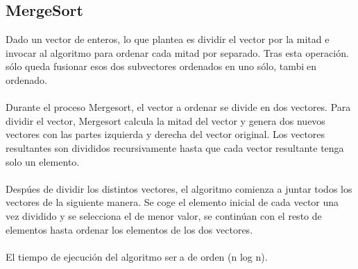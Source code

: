 \documentclass[12pt,twoside]{article}
\begin{document}
\subsection{MergeSort}
Dado un vector de enteros, lo que plantea es dividir el vector por la mitad e invocar
al algoritmo para ordenar cada mitad por separado. Tras esta operaci\'on.
s\'olo queda fusionar esos dos subvectores ordenados en uno s\'olo, tambien ordenado. \\\\
Durante el proceso Mergesort, el vector a ordenar se divide en dos vectores. Para dividir el vector, Mergesort calcula la mitad del vector y genera dos nuevos vectores con las partes izquierda y derecha del vector original. Los vectores resultantes son divididos recursivamente hasta que cada vector resultante
tenga solo un elemento. \\\\
Desp\'ues de dividir los distintos vectores, el algoritmo comienza a juntar todos
los vectores de la siguiente manera. Se coge el elemento inicial de cada vector
una vez dividido y se selecciona el de menor valor, se contin\'uan con el resto
de elementos hasta ordenar los elementos de los dos vectores. \\\\
El tiempo de ejecuci\'on del algoritmo sera de orden  \theta(n log n).
\end{document}
